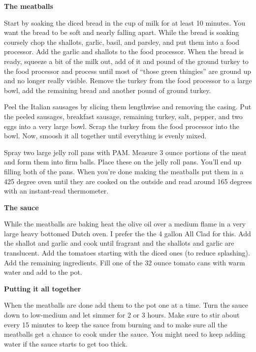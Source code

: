 \documentclass{article}
\begin{document}
\textbf{The meatballs}

Start by soaking the diced bread in the cup of milk for at least 10 minutes. You want the bread to be
soft and nearly falling apart. While the bread is soaking coursely chop the shallots, garlic, basil,
and parsley, and put them into a food processor.  Add the garlic and shallots to the food processor.
When the bread is ready, squeeze a bit of the milk out, add  of it and  pound
of the ground turkey to the food processor and process until most of ``those green thingies'' are
ground up and no longer really visible. Remove the turkey from the food processor to a large bowl, add the
remaining bread and another  pound of ground turkey.

Peel the Italian sausages by slicing them lengthwise and removing the casing. Put the peeled sausages,
breakfast sausage, remaining turkey, salt, pepper, and two eggs into a very large bowl. Scrap the turkey
from the food processor into the bowl. Now, smoosh it all together until everything is evenly mixed.

Spray two large jelly roll pans with PAM. Measure 3 ounce portions of the meat and form them
into firm balls. Place these on the jelly roll pans. You'll end up filling both of the pans. When you're done
making the meatballs put them in a 425 degree oven until they are cooked on the outside and read around
165 degrees with an instant-read thermometer.

\textbf{The sauce}

While the meatballs are baking heat the olive oil over a medium flame in a very large heavy bottomed Dutch oven.
I prefer the the 4 gallon All Clad for this. Add the shallot and garlic and cook until fragrant and the shallots
and garlic are translucent. Add the tomatoes starting with the diced ones (to reduce splashing). Add the remaining
ingredients. Fill one of the 32 ounce tomato cans with warm water and add to the pot.

\textbf{Putting it all together}

When the meatballs are done add them to the pot one at a time. Turn the sauce down to low-medium and let simmer
for 2 or 3 hours. Make sure to stir about every 15 minutes to keep the sauce from burning and to make sure all the
meatballs get a chance to cook under the sauce. You might need to keep adding water if the sauce starts to get too
thick.


\end{document}
